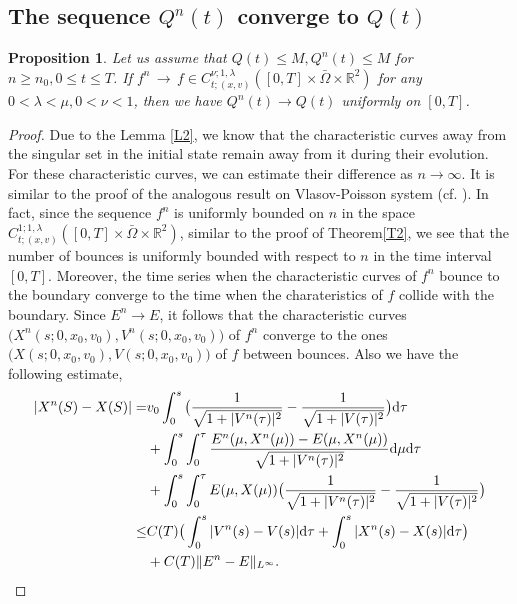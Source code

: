 \documentclass[11pt,reqno]{amsart}%
\newtheorem{Proposition}{Proposition}[section]
\theoremstyle{definition}
\theoremstyle{remark}
\begin{document}
\subsection{The sequence $Q^{n}(t)$ converge to $Q(t)$}
\begin{Proposition}\label{P7}
Let us assume that $Q(t)\leq M,  Q^{n}(t)\leq M$ for $n\geq n_{0}, 0\leq t\leq T$. If $f^{n}\,\rightarrow \,f\in C^{\nu;1,\lambda}_{t;(x,v)}([0,T]\times \bar{\Omega}\times \mathbb{R}^{2})$ for any $0<\lambda<\mu, 0<\nu<1$,  then we have $Q^{n}(t)\rightarrow Q(t)$ uniformly on $[0,T]$.
\end{Proposition}
\begin{proof}
Due to the Lemma \ref{L2}, we know that the characteristic curves away from the singular set  in the initial state remain away from it
during their evolution. For these characteristic curves, we can estimate their difference as $n\rightarrow \infty$.
It is similar to the proof of the analogous result on Vlasov-Poisson system (cf. \cite{HV,HV1}).
In fact, since the sequence $f^{n}$ is uniformly bounded on $n$ in the space $C^{1;1,\lambda}_{t;(x,v)}([0,T]\times \bar{\Omega}\times \mathbb{R}^{2})$, similar to the proof of Theorem\ref{T2}, we see that  the number of bounces is uniformly bounded with respect to $n$ in the time interval $[0,T]$.
Moreover, the time series when the characteristic curves of $f^{n}$ bounce to the boundary converge to the time when the charateristics of $f$ collide with the boundary.
Since $E^{n}\rightarrow E$, it follows that the characteristic curves $\big(X^{n}(s;0,x_{0},v_{0}),V^{n}(s;0,x_{0},v_{0})\big)$ of $f^{n}$ converge to the ones $\big(X(s;0,x_{0},v_{0}),V(s;0,x_{0},v_{0})\big)$ of $f$  between bounces. Also we have the following estimate, %
\begin{align}
|X^{n}(S)-X(S)|=&v_{0}\int^{s}_{0}\big(\frac{1}{\sqrt{1+|V^{n}(\tau)|^{2}}}-\frac{1}{\sqrt{1+|V(\tau)|^{2}}}\big) {\rm d}\tau \nonumber\\
&+\int^{s}_{0}\int^{\tau}_{0}\frac{E^{n}(\mu,X^{n}(\mu))-E(\mu,X^{n}(\mu))}{\sqrt{1+|V^{n}(\tau)|^{2}}}{\rm d}\mu{\rm d}\tau \nonumber\\
&+\int^{s}_{0}\int^{\tau}_{0}E(\mu,X(\mu))\big(\frac{1}{\sqrt{1+|V^{n}(\tau)|^{2}}}-\frac{1}{\sqrt{1+|V(\tau)|^{2}}}\big)\nonumber\\
\leq &C(T)\big(\int^{s}_{0}|V^{n}(s)-V(s)|{\rm d}\tau +\int^{s}_{0}|X^{n}(s)-X(s)|{\rm d}\tau\big)\nonumber\\
&+C(T)\|E^{n}-E\|_{L^{\infty}}.\nonumber
\end{align}

\end{proof}
\end{document}
